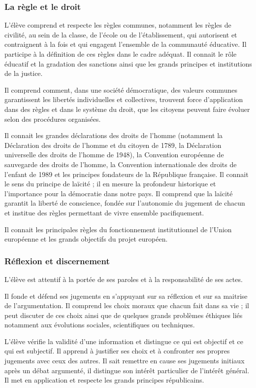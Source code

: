 \subsubsection{La règle et le droit}
L’élève comprend et respecte les règles communes, notamment les règles de civilité, au sein de la classe, de l’école ou de l’établissement, qui autorisent et contraignent à la fois et qui engagent l’ensemble de la communauté éducative. Il participe à la définition de ces règles dans le cadre adéquat. Il connait le rôle éducatif et la gradation des sanctions ainsi que les grands principes et institutions de la justice.

Il comprend comment, dans une société démocratique, des valeurs communes garantissent les libertés individuelles et collectives, trouvent force d’application dans des règles et dans le système du droit, que les citoyens peuvent faire évoluer selon des procédures organisées.

Il connait les grandes déclarations des droits de l’homme (notamment la Déclaration des droits de l’homme et du citoyen de 1789, la Déclaration universelle des droits de l’homme de 1948), la Convention européenne de sauvegarde des droits de l’homme, la Convention internationale des droits de l’enfant de 1989 et les principes fondateurs de la République française. Il connait le sens du principe de laïcité ; il en mesure la profondeur historique et l’importance pour la démocratie dans notre pays. Il comprend que la laïcité garantit la liberté de conscience, fondée sur l’autonomie du jugement de chacun et institue des règles permettant de vivre ensemble pacifiquement.

Il connait les principales règles du fonctionnement institutionnel de l’Union européenne et les grands objectifs du projet européen.

\subsubsection{Réflexion et discernement}
L’élève est attentif à la portée de ses paroles et à la responsabilité de ses actes.

Il fonde et défend ses jugements en s’appuyant sur sa réflexion et sur sa maitrise de l’argumentation. Il comprend les choix moraux que chacun fait dans sa vie ; il peut discuter de ces choix ainsi que de quelques grands problèmes éthiques liés notamment aux évolutions sociales, scientifiques ou techniques.

L’élève vérifie la validité d’une information et distingue ce qui est objectif et ce qui est subjectif. Il apprend à justifier ses choix et à confronter ses propres jugements avec ceux des autres. Il sait remettre en cause ses jugements initiaux après un débat argumenté, il distingue son intérêt particulier de l’intérêt général. Il met en application et respecte les grands principes républicains.


